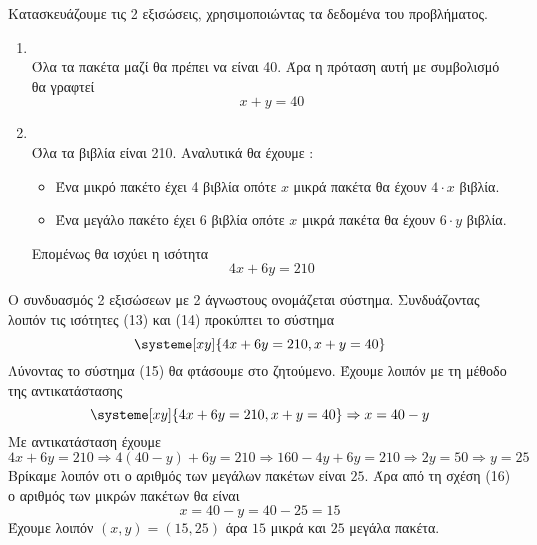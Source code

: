 \documentclass[twoside,nofonts,internet,methodoi]{thewria}
\begin{document}
Κατασκευάζουμε τις 2 εξισώσεις, χρησιμοποιώντας τα δεδομένα του προβλήματος.
\begin{enumerate}[label=\bf\textit{\arabic*\textsuperscript{o}\;στοιχείο},leftmargin=0cm,itemindent=2cm]
\item \mbox{}\\Όλα τα πακέτα μαζί θα πρέπει να είναι 40. Άρα η πρόταση αυτή με συμβολισμό θα γραφτεί  \begin{equation}
x+y=40
\end{equation} 
\item \mbox{}\\Όλα τα βιβλία είναι 210. Αναλυτικά θα έχουμε : 
\begin{itemize}
\item Ένα μικρό πακέτο έχει 4 βιβλία οπότε $ x $ μικρά πακέτα θα έχουν $ 4\cdot x $ βιβλία.
\item Ένα μεγάλο πακέτο έχει 6 βιβλία οπότε $ x $ μικρά πακέτα θα έχουν $ 6\cdot y $ βιβλία.
\end{itemize}
Επομένως θα ισχύει η ισότητα \begin{equation}
4x+6y=210
\end{equation} 
\end{enumerate}
Ο συνδυασμός 2 εξισώσεων με 2 άγνωστους ονομάζεται σύστημα. Συνδυάζοντας λοιπόν τις ισότητες (13) και (14) προκύπτει το σύστημα \begin{equation}
\systeme[xy]{4x+6y=210,x+y=40}
\end{equation}
Λύνοντας το σύστημα (15) θα φτάσουμε στο ζητούμενο. Έχουμε λοιπόν με τη μέθοδο της αντικατάστασης
\begin{equation} 
\systeme[xy]{4x+6y=210,x+y=40}\Rightarrow x=40-y \end{equation}
Με αντικατάσταση έχουμε
\[ 4x+6y=210\Rightarrow 4(40-y)+6y=210\Rightarrow 160 -4y+6y=210\Rightarrow2y=50\Rightarrow y=25 \]
Βρίκαμε λοιπόν οτι ο αριθμός των μεγάλων πακέτων είναι $ 25 $. Άρα από τη σχέση (16) ο αριθμός των μικρών πακέτων θα είναι
\[ x=40-y=40-25=15 \]
Έχουμε λοιπόν $ (x,y)=(15,25) $ άρα $ 15 $ μικρά και $ 25 $ μεγάλα πακέτα.
\end{document}

